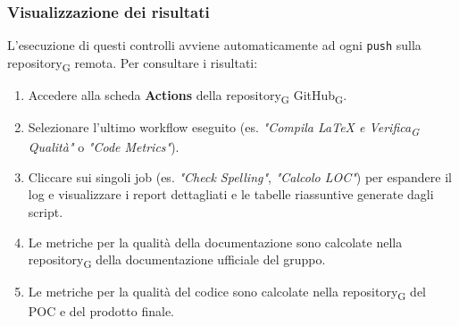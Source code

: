 \documentclass[11pt,a4paper]{article}
\newcommand{\gls}[1]{#1\textsubscript{G}}
\begin{document}
\subsubsection{Visualizzazione dei risultati}
L'esecuzione di questi controlli avviene automaticamente ad ogni \texttt{push} sulla \gls{repository} remota. Per consultare i risultati:
\begin{enumerate}
    \item Accedere alla scheda \textbf{Actions} della \gls{repository} \gls{GitHub}.
    \item Selezionare l'ultimo workflow eseguito (es. \textit{"Compila LaTeX e \gls{Verifica} Qualità"} o \textit{"Code Metrics"}).
    \item Cliccare sui singoli job (es. \textit{"Check Spelling"}, \textit{"Calcolo LOC"}) per espandere il log e visualizzare i report dettagliati e le tabelle riassuntive generate dagli script.
    \item Le metriche per la qualità della documentazione sono calcolate nella \gls{repository} della documentazione ufficiale del gruppo.
    \item Le metriche per la qualità del codice sono calcolate nella \gls{repository} del POC e del prodotto finale.
\end{enumerate}
\end{document}
